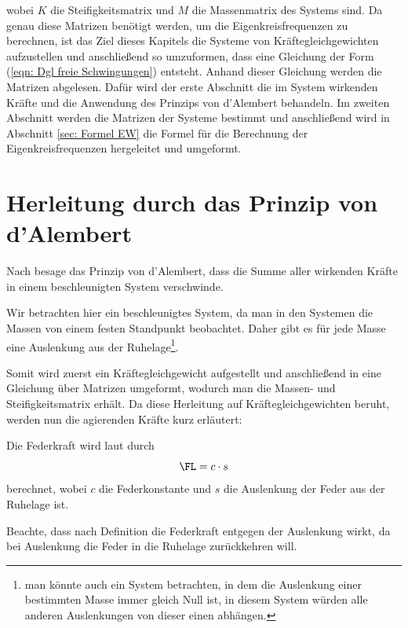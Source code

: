 \documentclass[a4paper,12pt]{report}
\newcommand{\1}{\mathds{1}}
\theoremstyle{plain} %
\theoremstyle{definition} %
\theoremstyle{remark}
\begin{document}
      wobei $K$ die Steifigkeitsmatrix und $M$ die Massenmatrix des Systems sind.
      Da genau diese Matrizen benötigt werden, um die Eigenkreisfrequenzen zu berechnen, ist das Ziel dieses Kapitels die Systeme von Kräftegleichgewichten aufzustellen und anschließend so umzuformen, dass eine Gleichung der Form (\ref{eqn: Dgl freie Schwingungen}) entsteht.
      Anhand dieser Gleichung werden die Matrizen abgelesen.
      Dafür wird der erste Abschnitt die im System wirkenden Kräfte und die Anwendung des Prinzips von d'Alembert behandeln.
      Im zweiten Abschnitt werden die Matrizen der Systeme bestimmt und anschließend wird in Abschnitt \ref{sec: Formel EW} die Formel für die Berechnung der Eigenkreisfrequenzen hergeleitet und umgeformt. 
      
      \section{Herleitung durch das Prinzip von d'Alembert}
            Nach \cite{d_AlembertPrinzip} besage das Prinzip von d'Alembert, dass die Summe aller wirkenden Kräfte in einem beschleunigten System verschwinde.

            Wir betrachten hier ein beschleunigtes System, da man in den Systemen die Massen von einem festen Standpunkt beobachtet.
            Daher gibt es für jede Masse eine Auslenkung aus der Ruhelage\footnote{man könnte auch ein System betrachten, in dem die Auslenkung einer bestimmten Masse immer gleich Null ist, in diesem System würden alle anderen Auslenkungen von dieser einen abhängen.}.

            Somit wird zuerst ein Kräftegleichgewicht aufgestellt und anschließend in eine Gleichung über Matrizen umgeformt, wodurch man die Massen- und Steifigkeitsmatrix erhält.
            Da diese Herleitung auf Kräftegleichgewichten beruht, werden nun die agierenden Kräfte kurz erläutert:

            Die Federkraft \FL wird laut \cite{federkraft} durch
            \begin{equation}
                  \label{eqn: Federkraft}
                  \FL = c\cdot s
            \end{equation}
            berechnet, wobei $c$ die Federkonstante und $s$ die Auslenkung der Feder aus der Ruhelage ist.

            Beachte, dass nach Definition die Federkraft entgegen der Auslenkung wirkt, da bei Auslenkung die Feder in die Ruhelage zurückkehren will.
                  
\end{document}
